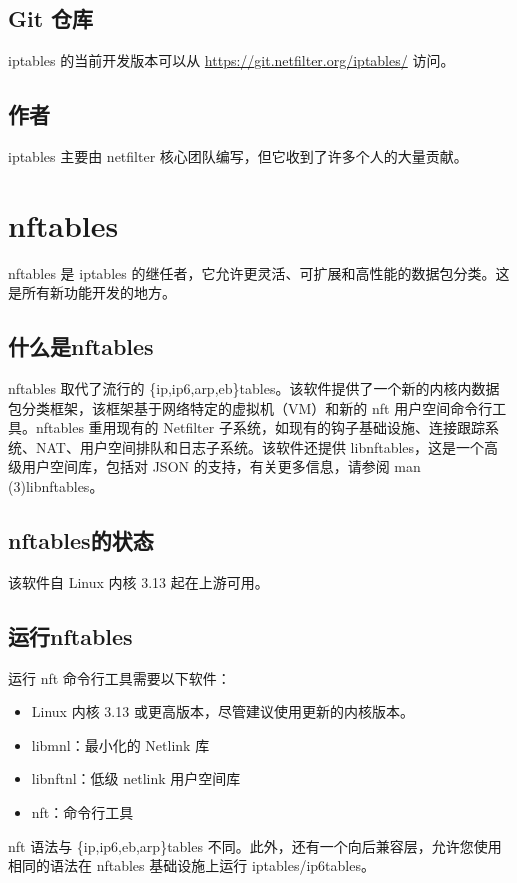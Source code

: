 \documentclass[12pt,UTF8]{ctexbook}
\begin{document}
\subsection{Git 仓库}
iptables 的当前开发版本可以从 \url{https://git.netfilter.org/iptables/} 访问。

\subsection{作者}
iptables 主要由 netfilter 核心团队编写，但它收到了许多个人的大量贡献。

\section{nftables}
nftables 是 iptables 的继任者，它允许更灵活、可扩展和高性能的数据包分类。这是所有新功能开发的地方。

\subsection{什么是nftables}
nftables 取代了流行的 \{ip,ip6,arp,eb\}tables。该软件提供了一个新的内核内数据包分类框架，该框架基于网络特定的虚拟机（VM）和新的 nft 用户空间命令行工具。nftables 重用现有的 Netfilter 子系统，如现有的钩子基础设施、连接跟踪系统、NAT、用户空间排队和日志子系统。该软件还提供 libnftables，这是一个高级用户空间库，包括对 JSON 的支持，有关更多信息，请参阅 man (3)libnftables。

\subsection{nftables的状态}
该软件自 Linux 内核 3.13 起在上游可用。

\subsection{运行nftables}
运行 nft 命令行工具需要以下软件：
\begin{itemize}
  \item Linux 内核 3.13 或更高版本，尽管建议使用更新的内核版本。
  \item libmnl：最小化的 Netlink 库
  \item libnftnl：低级 netlink 用户空间库
  \item nft：命令行工具
\end{itemize}

nft 语法与 \{ip,ip6,eb,arp\}tables 不同。此外，还有一个向后兼容层，允许您使用相同的语法在 nftables 基础设施上运行 iptables/ip6tables。
\end{document}
